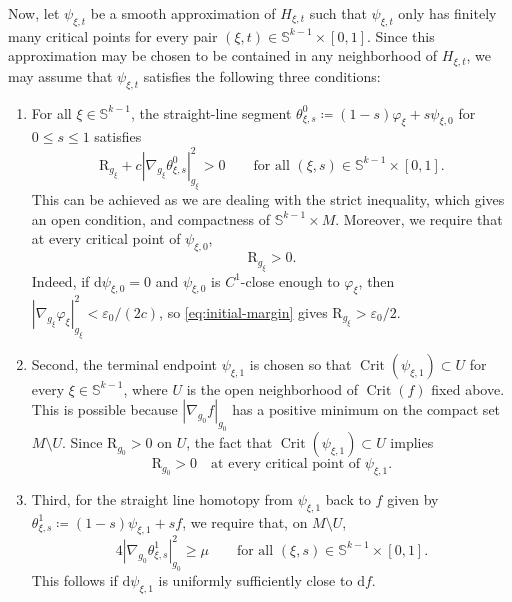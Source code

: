 \documentclass[11pt]{amsart}
\numberwithin{equation}{section}
\newcommand{\scal}{\mathrm{R}}
\DeclareMathOperator{\Crit}{Crit}
\let\geq\geqslant
\let\leq\leqslant
\begin{document}
Now, let $\psi_{\xi,t}$ be a smooth approximation of $H_{\xi,t}$ such that $\psi_{\xi,t}$ only has finitely many critical points for every pair $(\xi,t)\in\mathbb S^{k-1}\times[0,1]$.
Since this approximation may be chosen to be contained in any neighborhood of $H_{\xi,t}$, we may assume that $\psi_{\xi,t}$ satisfies the following three conditions:
\begin{enumerate}
  \item For all $\xi \in \mathbb S^{k-1}$, the straight-line segment $\theta^{0}_{\xi ,s}\coloneqq (1-s)\varphi_\xi+s\psi_{\xi,0}$ for $0\leq s\leq1$ satisfies
  \begin{equation}\label{eq:initial-short-positive}
    \scal_{g_\xi}+c|\nabla_{g_\xi}\theta^{0}_{\xi,s}|_{g_\xi}^2>0\qquad\text{for all }(\xi,s)\in \mathbb S^{k-1}\times[0,1].
  \end{equation}
  This can be achieved as we are dealing with the strict inequality, which gives an open condition, and compactness of $\mathbb S^{k-1}\times M$.
  Moreover, we require that at every critical point of $\psi_{\xi,0}$,
  \begin{equation}\label{eq:initial-critical-R-positive}
  \scal_{g_\xi}>0.
  \end{equation}
  Indeed, if $\mathrm{d}\psi_{\xi,0}=0$ and $\psi_{\xi,0}$ is $C^1$-close enough to $\varphi_\xi$, then
  $|\nabla_{g_\xi}\varphi_\xi|_{g_\xi}^2<\varepsilon_0/(2c)$, so \eqref{eq:initial-margin} gives
  $\scal_{g_\xi}>\varepsilon_0/2$.
  \medskip
  \item Second, the terminal endpoint $\psi_{\xi,1}$ is chosen so that $\Crit(\psi_{\xi,1})\subset U$ for every $\xi\in \mathbb S^{k-1}$, where $U$ is the open neighborhood of $\Crit(f)$ fixed above.
  This is possible because $|\nabla_{g_0}f|_{g_0}$ has a positive minimum on the compact set $M\setminus U$.
  Since $\scal_{g_0}>0$ on $U$, the fact that $\Crit(\psi_{\xi,1})\subset U$ implies
  \begin{equation}\label{eq:terminal-critical-R-positive}
    \scal_{g_0}>0\quad\text{at every critical point of }\psi_{\xi,1}.
  \end{equation}
  \item Third, for the straight line homotopy from $\psi_{\xi,1}$ back to $f$ given by $\theta^{1}_{\xi,s}\coloneqq (1-s)\psi_{\xi,1}+s f$, we require that, on $M\setminus U$,
  \begin{equation}\label{eq:terminal-gradient-bound}
    4|\nabla_{g_0}\theta^{1}_{\xi,s}|_{g_0}^2\geq \mu \qquad\text{for all }(\xi,s)\in \mathbb S^{k-1}\times[0,1].
  \end{equation}
  This follows if $\mathrm{d}\psi_{\xi,1}$ is uniformly sufficiently close to $\mathrm{d}f$. 
\end{enumerate}
\end{document}
